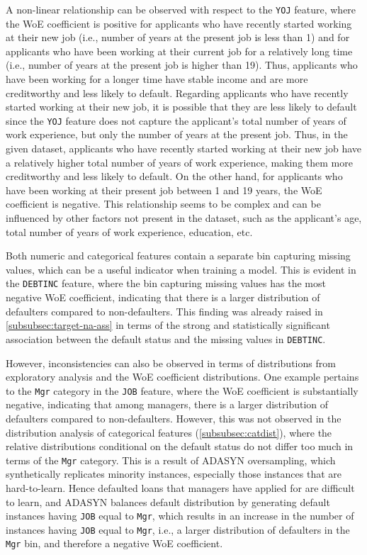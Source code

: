 A non-linear relationship can be observed with respect to the \texttt{YOJ} feature, where the WoE coefficient is positive for applicants who have recently started working at their new job (i.e., number of years at the present job is less than 1) and for applicants who have been working at their current job for a relatively long time (i.e., number of years at the present job is higher than 19).
Thus, applicants who have been working for a longer time have stable income and are more creditworthy and less likely to default.
Regarding applicants who have recently started working at their new job, it is possible that they are less likely to default since the \texttt{YOJ} feature does not capture the applicant's total number of years of work experience, but only the number of years at the present job.
Thus, in the given dataset, applicants who have recently started working at their new job have a relatively higher total number of years of work experience, making them more creditworthy and less likely to default. On the other hand, for applicants who have been working at their present job between 1 and 19 years, the WoE coefficient is negative.
This relationship seems to be complex and can be influenced by other factors not present in the dataset, such as the applicant's age, total number of years of work experience, education, etc.

Both numeric and categorical features contain a separate bin capturing missing values, which can be a useful indicator when training a model. This is evident in the \texttt{DEBTINC} feature, where the bin capturing missing values has the most negative WoE coefficient, indicating that there is a larger distribution of defaulters compared to non-defaulters.
This finding was already raised in \autoref{subsubsec:target-na-ass} in terms of the strong and statistically significant association between the default status and the missing values in \texttt{DEBTINC}.

However, inconsistencies can also be observed in terms of distributions from exploratory analysis and the WoE coefficient distributions.
One example pertains to the \texttt{Mgr} category in the \texttt{JOB} feature, where the WoE coefficient is substantially negative, indicating that among managers, there is a larger distribution of defaulters compared to non-defaulters.
However, this was not observed in the distribution analysis of categorical features (\autoref{subsubsec:catdist}), where the relative distributions conditional on the default status do not differ too much in terms of the \texttt{Mgr} category.
This is a result of ADASYN oversampling, which synthetically replicates minority instances, especially those instances that are hard-to-learn.
Hence defaulted loans that managers have applied for are difficult to learn, and ADASYN balances default distribution by generating default instances having \texttt{JOB} equal to \texttt{Mgr}, which results in an increase in the number of instances having \texttt{JOB} equal to \texttt{Mgr}, i.e., a larger distribution of defaulters in the \texttt{Mgr} bin, and therefore a negative WoE coefficient.


